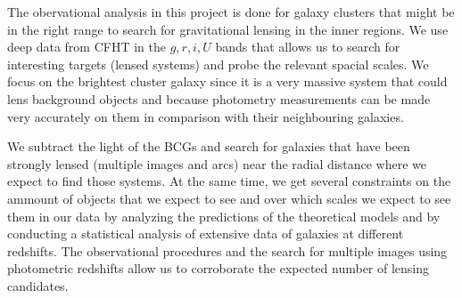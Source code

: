 The obervational analysis in this project is done for galaxy clusters that might be in the right range to search for gravitational lensing in the inner regions. We use deep data from CFHT in the $g,r,i,U$ bands that allows us to search for interesting targets (lensed systems) and probe the relevant spacial scales. We focus on the brightest cluster galaxy since it is a very massive system that could lens background objects and because photometry measurements can be made very accurately on them in comparison with their neighbouring galaxies. 

We subtract the light of the BCGs and search for galaxies that have been strongly lensed (multiple images and arcs) near the radial distance where we expect to find those systems. At the same time, we get several constraints on the ammount of objects that we expect to see and over which scales we expect to see them in our data by analyzing the predictions of the theoretical models and by conducting a statistical analysis of extensive data of galaxies at different redshifts. The observational procedures and the search for multiple images using photometric redshifts allow us to corroborate the expected number of lensing candidates.    

